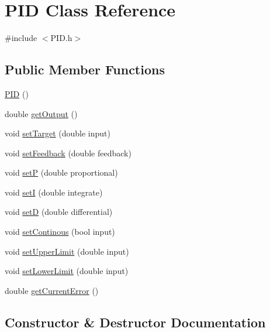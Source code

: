 \hypertarget{classPID}{}\section{P\+ID Class Reference}
\label{classPID}


{\ttfamily \#include $<$P\+I\+D.\+h$>$}

\subsection*{Public Member Functions}
\begin{DoxyCompactItemize}
\item 
\hyperlink{classPID_a0311b6f7de348499ce24e53ba353514a}{P\+ID} ()
\item 
double \hyperlink{classPID_ae0f84ab82896e8a66839454d6ed53a99}{get\+Output} ()
\item 
void \hyperlink{classPID_a26c3b4eaaf92e3a2725d9b38996deab2}{set\+Target} (double input)
\item 
void \hyperlink{classPID_ae39d79cca4984d655496a732653f24b8}{set\+Feedback} (double feedback)
\item 
void \hyperlink{classPID_a9859836fda219298f1a37124553816bb}{setP} (double proportional)
\item 
void \hyperlink{classPID_adbeb511ef92e869224d56203164e7c21}{setI} (double integrate)
\item 
void \hyperlink{classPID_a28242935e76099bb3f7dadca5d637bf2}{setD} (double differential)
\item 
void \hyperlink{classPID_a640deac7e631eb4858cc0a52cc71c18f}{set\+Continous} (bool input)
\item 
void \hyperlink{classPID_a2038d6acd67632ea79f5675632f5db40}{set\+Upper\+Limit} (double input)
\item 
void \hyperlink{classPID_af08ab0140dca0984fac5be716e806e75}{set\+Lower\+Limit} (double input)
\item 
double \hyperlink{classPID_a9ba7082205aa282a8fb42067f1432201}{get\+Current\+Error} ()
\end{DoxyCompactItemize}


\subsection{Constructor \& Destructor Documentation}
\mbox{\label{classPID_a0311b6f7de348499ce24e53ba353514a}} 
